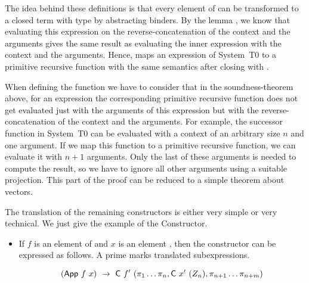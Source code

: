 \documentclass{jfp}
\begin{document}


\sTtoPRSignature

\sTtoPRSoundSig

The idea behind these definitions is that every element of
 can be transformed to a closed term with type
 by abstracting  binders. By
the lemma , we know that evaluating this
expression on the reverse-concatenation of the context and the arguments
gives the same result as evaluating the inner expression with the
context and the arguments. 
Hence,  maps an expression of System~T0 to 
a primitive recursive function with the same semantics after closing with  .

When defining the function  we have to consider
that in the soundness-theorem above, for an expression the
corresponding primitive recursive function 
does not get evaluated just with the arguments of this expression but with the reverse-concatenation of the context and the arguments.
%
For example, the successor function in System~T0 can be evaluated with
a context of an arbitrary size $n$ and one argument. If we map this
function to a primitive recursive function, we can evaluate it with $n
+ 1$ arguments. Only the last of these arguments is needed to compute
the result, so we have to ignore all other arguments using a suitable projection. 
\sTtoPRSuc
This part of the proof can be reduced to a simple theorem about vectors. 
\sTtoPRSoundSuc
\lookupFromN

The translation of the remaining constructors is either very simple or very technical. We just give the example of the  Constructor.
\begin{itemize}
\item If $f$ is an element of  and $x$ is
  an element , then the
   constructor can be expressed as
  follows. A prime marks translated subexpressions.
	
	$$ (\AgdaInductiveConstructor{App} \ f \ x) \ \rightarrow \ \AgdaInductiveConstructor{C} \ f' \ (\pi_{1}\dots\pi_{n}, \AgdaInductiveConstructor{C} \ x' \ (Z_{n}),\pi_{n + 1}\dots\pi_{n + m}  ) $$ 
\end{itemize}
\end{document}
